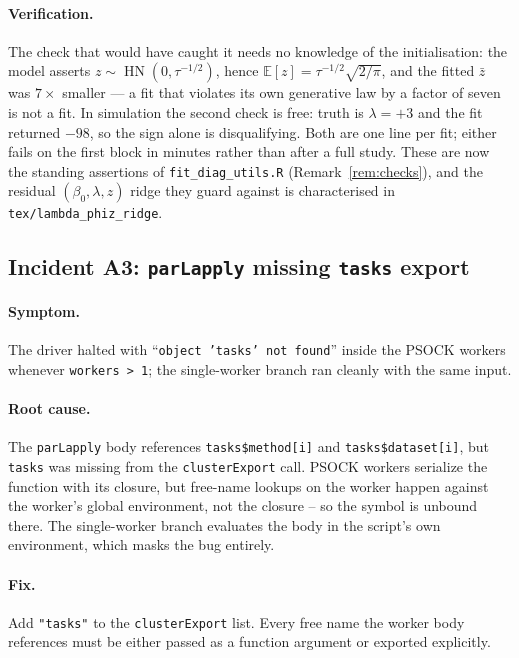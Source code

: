 \documentclass[11pt]{article}
\theoremstyle{definition}
\theoremstyle{remark}
\newcommand{\E}{\mathbb{E}}
\newcommand{\hn}{\operatorname{HN}}
\begin{document}
\paragraph{Verification.}
The check that would have caught it needs no knowledge of the
initialisation: the model asserts $z\sim\hn(0,\tau^{-1/2})$, hence
$\E[z]=\tau^{-1/2}\sqrt{2/\pi}$, and the fitted $\bar z$ was $7\times$
smaller --- a fit that violates its own generative law by a factor of
seven is not a fit. In simulation the second check is free: truth is
$\lambda=+3$ and the fit returned $-98$, so the sign alone is
disqualifying. Both are one line per fit; either fails on the first block
in minutes rather than after a full study. These are now the standing
assertions of \texttt{fit\_diag\_utils.R} (Remark~\ref{rem:checks}), and
the residual $(\beta_0,\lambda,z)$ ridge they guard against is characterised
in \texttt{tex/lambda\_phiz\_ridge}.

\subsection{Incident A3: \texttt{parLapply} missing \texttt{tasks} export}
\label{sec:audit-psock}

\paragraph{Symptom.}
The driver halted with ``\texttt{object 'tasks' not found}'' inside
the PSOCK workers whenever \texttt{workers > 1}; the single-worker
branch ran cleanly with the same input.

\paragraph{Root cause.}
The \texttt{parLapply} body references \texttt{tasks\$method[i]} and
\texttt{tasks\$dataset[i]}, but \texttt{tasks} was missing from the
\texttt{clusterExport} call. PSOCK workers serialize the function
with its closure, but free-name lookups on the worker happen against
the worker's global environment, not the closure -- so the symbol
is unbound there. The single-worker branch evaluates the body in
the script's own environment, which masks the bug entirely.

\paragraph{Fix.}
Add \texttt{"tasks"} to the \texttt{clusterExport} list. Every free
name the worker body references must be either passed as a
function argument or exported explicitly.
\end{document}

